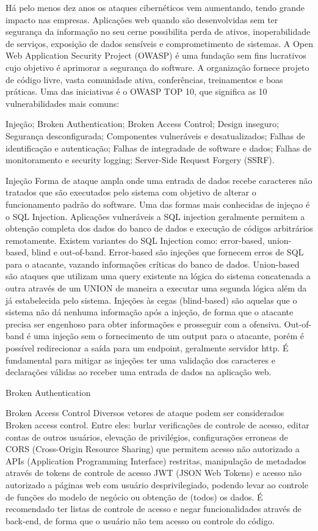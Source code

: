 Há pelo menos dez anos os ataques cibernéticos vem aumentando, tendo grande impacto nas empresas.
Aplicações web quando são desenvolvidas sem ter segurança da informação no seu cerne possibilita perda de ativos, inoperabilidade de serviços, exposição de dados sensíveis e comprometimento de sistemas. 
A Open Web Application Security Project (OWASP) é uma fundação sem fins lucrativos cujo objetivo é aprimorar a segurança do software. A organização fornece projeto de código livre, vasta comunidade ativa, conferências, treinamentos e boas práticas. Uma das iniciativas é o OWASP TOP 10, que significa as 10 vulnerabilidades mais comuns:

Injeção;
Broken Authentication;
Broken Access Control;
Design inseguro;
Segurança desconfigurada;
Componentes vulneráveis e desatualizados;
Falhas de identificação e autenticação;
Falhas de integradade de software e dados;
Falhas de monitoramento e security logging;
Server-Side Request Forgery (SSRF).

Injeção
Forma de ataque ampla onde uma entrada de dados recebe caracteres não tratados que são executados pelo sistema com objetivo de alterar o funcionamento padrão do software.
Uma das formas mais conhecidas de injeçao é o SQL Injection. Aplicações vulneráveis a SQL injection geralmente permitem a obtenção completa dos dados do banco de dados e execução de códigos arbitrários remotamente. Existem variantes do SQL Injection como: error-based, union-based, blind e out-of-band. Error-based são injeções que fornecem erros de SQL para o atacante, vazando informações críticas do banco de dados. Union-based são ataques que utilizam uma query existente na lógica do sistema concatenada a outra através de um UNION de maneira a executar uma segunda lógica além da já estabelecida pelo sistema. Injeções às cegas (blind-based) são aquelas que o sistema não dá nenhuma informação após a injeção, de forma que o atacante precisa ser engenhoso para obter informações e prosseguir com a ofensiva. Out-of-band é uma injeção sem o fornecimento de um output para o atacante, porém é possível redirecionar a saída para um endpoint, geralmente servidor http.
É fundamental para mitigar as injeções ter uma validação dos caracteres e declarações válidas ao receber uma entrada de dados na aplicação web.

Broken Authentication


Broken Access Control
Diversos vetores de ataque podem ser considerados Broken access control. Entre eles: burlar verificações de controle de acesso, editar contas de outros usuários, elevação de privilégios, configurações erroneas de CORS (Cross-Origin Resource Sharing) que permitem acesso não autorizado a APIs (Application Programming Interface) restritas, manipulação de metadados através de tokens de controle de acesso JWT (JSON Web Tokens) e acesso não autorizado a páginas web com usuário desprivilegiado, podendo levar ao controle de funções do modelo de negócio ou obtenção de (todos) os dados.
É recomendado ter listas de controle de acesso e negar funcionalidades através de back-end, de forma que o usuário não tem acesso ou controle do código.




